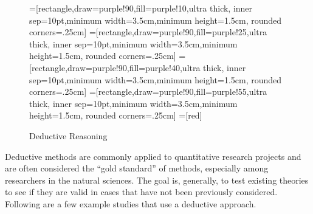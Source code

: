 \begin{center}
	\begin{figure}[H]
		=[rectangle,draw=purple!90,fill=purple!10,ultra thick,
		inner sep=10pt,minimum width=3.5cm,minimum height=1.5cm,
		rounded corners=.25cm]
		=[rectangle,draw=purple!90,fill=purple!25,ultra thick,
		inner sep=10pt,minimum width=3.5cm,minimum height=1.5cm,
		rounded corners=.25cm]
		=[rectangle,draw=purple!90,fill=purple!40,ultra thick,
		inner sep=10pt,minimum width=3.5cm,minimum height=1.5cm,
		rounded corners=.25cm]
		=[rectangle,draw=purple!90,fill=purple!55,ultra thick,
		inner sep=10pt,minimum width=3.5cm,minimum height=1.5cm,
		rounded corners=.25cm]			
		=[red]
		\caption{Deductive Reasoning}
		\label{02:fig06}
	\end{figure}
\end{center}

Deductive methods are commonly applied to quantitative research projects and are often considered the ``gold standard'' of methods, especially among researchers in the natural sciences. The goal is, generally, to test existing theories to see if they are valid in cases that have not been previously considered. Following are a few example studies that use a deductive approach.

